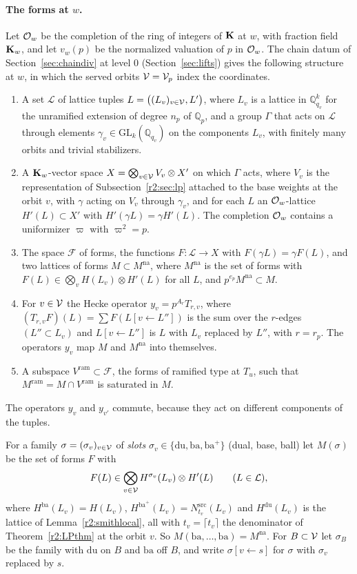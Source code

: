\paragraph{The forms at $w$.} Let $\mathcal O_w$ be the completion of the ring of integers of $\mathbf K$ at $w$, with fraction field $\mathbf K_w$, and let $v_w(p)$ be the normalized valuation of $p$ in $\mathcal O_w$. The chain datum of Section~\ref{sec:chaindiv} at level $0$ (Section~\ref{sec:lifts}) gives the following structure at $w$, in which the served orbits $\mathcal V=\mathcal V_p$ index the coordinates.
\begin{enumerate}
\item[(F1)] A set $\mathcal L$ of lattice tuples $L=\big((L_v)_{v\in\mathcal V},L'\big)$, where $L_v$ is a lattice in $\mathbb Q_{q_v}^k$ for the unramified extension of degree $n_p$ of $\mathbb Q_p$, and a group $\Gamma$ that acts on $\mathcal L$ through elements $\gamma_v\in\mathrm{GL}_k(\mathbb Q_{q_v})$ on the components $L_v$, with finitely many orbits and trivial stabilizers.
\item[(F2)] A $\mathbf K_w$-vector space $X=\bigotimes_{v\in\mathcal V}V_v\otimes X'$ on which $\Gamma$ acts, where $V_v$ is the representation of Subsection~\ref{r2:sec:lp} attached to the base weights at the orbit $v$, with $\gamma$ acting on $V_v$ through $\gamma_v$, and for each $L$ an $\mathcal O_w$-lattice $H'(L)\subset X'$ with $H'(\gamma L)=\gamma H'(L)$. The completion $\mathcal O_w$ contains a uniformizer $\varpi$ with $\varpi^2=p$.
\item[(F3)] The space $\mathcal F$ of forms, the functions $F\colon\mathcal L\to X$ with $F(\gamma L)=\gamma F(L)$, and two lattices of forms $M\subset M^{\mathrm{na}}$, where $M^{\mathrm{na}}$ is the set of forms with $F(L)\in\bigotimes_vH(L_v)\otimes H'(L)$ for all $L$, and $p^{e_p}M^{\mathrm{na}}\subset M$.
\item[(F4)] For $v\in\mathcal V$ the Hecke operator $y_v=p^{A_{r}}T_{r,v}$, where $(T_{r,v}F)(L)=\sum F(L[v\leftarrow L''])$ is the sum over the $r$-edges $(L''\subset L_v)$ and $L[v\leftarrow L'']$ is $L$ with $L_v$ replaced by $L''$, with $r=r_p$. The operators $y_v$ map $M$ and $M^{\mathrm{na}}$ into themselves.
\item[(F5)] A subspace $V^{\mathrm{ram}}\subset\mathcal F$, the forms of ramified type at $T_u$, such that $M^{\mathrm{ram}}=M\cap V^{\mathrm{ram}}$ is saturated in $M$.
\end{enumerate}
The operators $y_v$ and $y_{v'}$ commute, because they act on different components of the tuples.

For a family $\sigma=(\sigma_v)_{v\in\mathcal V}$ of \emph{slots} $\sigma_v\in\{\mathrm{du},\mathrm{ba},\mathrm{ba}^+\}$ (dual, base, ball) let $M(\sigma)$ be the set of forms $F$ with
\[
F(L)\in\bigotimes_{v\in\mathcal V}H^{\sigma_v}(L_v)\otimes H'(L)\qquad(L\in\mathcal L),
\]
where $H^{\mathrm{ba}}(L_v)=H(L_v)$, $H^{\mathrm{ba}^+}(L_v)=N^{\mathrm{src}}_{t_v}(L_v)$ and $H^{\mathrm{du}}(L_v)$ is the lattice of Lemma~\ref{r2:smithlocal}, all with $t_v=\lceil t_{v}\rceil$ the denominator of Theorem~\ref{r2:LPthm} at the orbit $v$. So $M(\mathrm{ba},\dots,\mathrm{ba})=M^{\mathrm{na}}$. For $B\subset\mathcal V$ let $\sigma_B$ be the family with $\mathrm{du}$ on $B$ and $\mathrm{ba}$ off $B$, and write $\sigma[v\leftarrow s]$ for $\sigma$ with $\sigma_v$ replaced by $s$.

